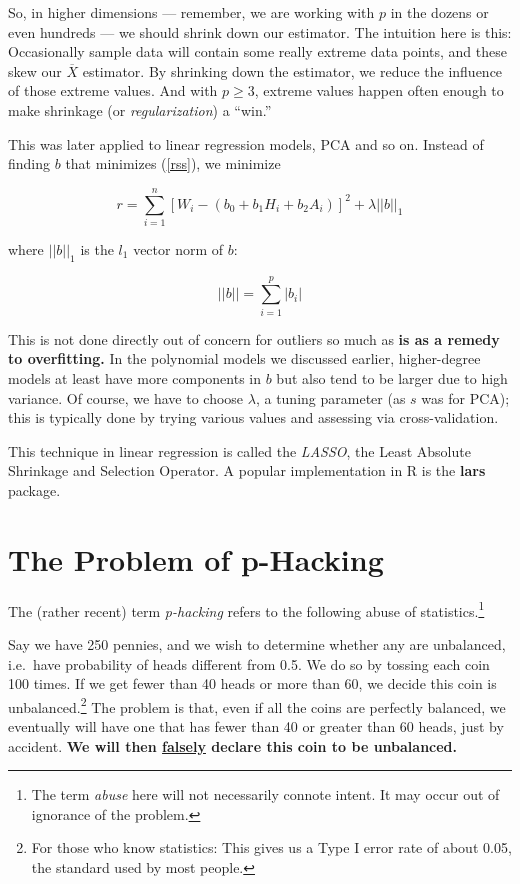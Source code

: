 So, in higher dimensions --- remember, we are working with $p$ in the
dozens or even hundreds --- we should shrink down our estimator.  The
intuition here is this:  Occasionally sample data will contain some
really extreme data points, and these skew our $\overline{X}$ estimator.
By shrinking down the estimator, we reduce the influence of those
extreme values.  And with $p \geq 3$, extreme values happen often
enough to make shrinkage (or \textit{regularization}) a ``win.''

This was later applied to linear regression models, PCA and so on.
Instead of finding $b$ that minimizes (\ref{rss}), we minimize

\begin{equation}
r =
\sum_{i=1}^n [W_i - (b_0 + b_1 H_i + b_2 A_i)]^2 + \lambda ||b||_1
\end{equation}

where $||b||_1$ is the $l_1$ vector norm of $b$:

\begin{equation}
||b|| = \sum_{i=1}^p |b_i|
\end{equation}


This is not done directly out of concern for outliers so much as
\textbf{is as a remedy to overfitting.}  In the polynomial models we
discussed earlier, higher-degree models at least have more components in
$b$ but also tend to be larger due to high variance.  Of course, we have
to choose $\lambda$, a tuning parameter (as $s$ was for PCA); this is
typically done by trying various values and assessing via
cross-validation.

This technique in linear regression is called the \textit{LASSO},
the Least Absolute Shrinkage and Selection Operator.  A popular
implementation in R is the \textbf{lars} package.

\section{The Problem of p-Hacking}

The (rather recent) term \textit{p-hacking} refers to the following
abuse of statistics.\footnote{The term \textit{abuse} here will not
necessarily connote intent. It may occur out of ignorance of the
problem.}

Say we have 250 pennies, and we wish to determine whether any are
unbalanced, i.e.\ have probability of heads different from 0.5.  We do
so by tossing each coin 100 times.  If we get fewer than 40 heads or
more than 60, we decide this coin is unbalanced.\footnote{For those who
know statistics:  This gives us a Type I error rate of about 0.05, the
standard used by most people.}  The problem is that, even if all the
coins are perfectly balanced, we eventually will have one that has fewer
than 40 or greater than 60 heads, just by accident.  \textbf{We will
then \underline{falsely} declare this coin to be unbalanced.}


